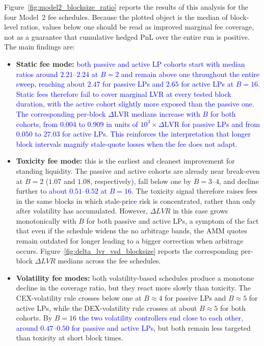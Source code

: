 \documentclass[11pt]{article}
\begin{document}
Figure~\ref{fig:model2_blocksize_ratio} reports the results of this analysis for the four Model~2 fee schedules. Because the
plotted object is the median of block-level ratios, values below one should be read as improved marginal fee coverage,
not as a guarantee that cumulative hedged PnL over the entire run is positive. The main findings are:
\begin{itemize}
  \item \textbf{Static fee mode:} \textcolor{blue}{both passive and active LP cohorts start with median ratios around $2.21$--$2.24$ at 
  $B=2$ and remain above one throughout the entire sweep, reaching about $2.47$ for passive LPs and $2.65$ for active LPs at 
  $B=16$. Static fees therefore fail to cover marginal LVR at every tested block duration, with the active cohort slightly more exposed than the passive one. The corresponding per-block $\Delta\mathrm{LVR}$ medians increase with $B$ for both cohorts, from $0.004$ to $0.909$ in units of $10^3\times\Delta\mathrm{LVR}$ for passive LPs and from $0.050$ to $27.03$ for active LPs. This reinforces the interpretation that longer block intervals magnify stale-quote losses when the fee does not adapt.}
  \item \textbf{Toxicity fee mode:} this is the earliest and cleanest improvement for standing liquidity. The passive 
  and active cohorts are already near break-even at $B=2$ ($1.07$ and $1.08$, respectively), fall below one by 
  $B=3$--$4$, and decline further to \textcolor{blue}{about $0.51$--$0.52$ at $B=16$.} The toxicity signal therefore raises fees in 
  the same blocks in which stale-price risk is concentrated, rather than only after volatility has accumulated. However,
  $\Delta LVR$ in this case grows monotonically with $B$ for both passive and active LPs, a symptom of the fact that even if 
  the schedule widens the no arbitrage bands, the AMM quotes remain outdated for longer leading to a bigger correction
  when arbitrage occurs. Figure~\ref{fig:delta_lvr_vsd_blocksize} reports the corresponding
  per-block $\Delta LVR$ medians across the fee schedules.
  \item \textbf{Volatility fee modes:} both volatility-based schedules produce a monotone decline in the coverage ratio, 
  but they react more slowly than toxicity. The CEX-volatility rule crosses below one at $B\approx 4$ for passive LPs 
  and $B\approx 5$ for active LPs, while the DEX-volatility rule crosses at about $B\approx 5$ for both cohorts. By 
  $B=16$ \textcolor{blue}{the two volatility controllers end close to each other, around $0.47$--$0.50$ for passive and active LPs,} but both remain less targeted than toxicity at short block times.

\end{itemize}
\end{document}
